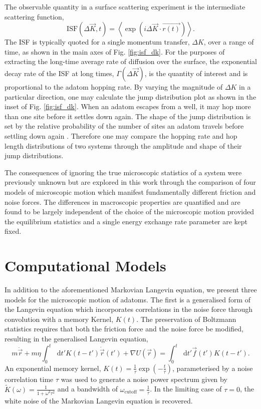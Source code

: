 \documentclass[7pt]{article}
\newcommand*{\diff}{\mathop{}\!\mathrm{d}}
\begin{document}
The observable quantity in a surface scattering experiment is the intermediate scattering function,
$$
\mathrm{ISF}(\Delta{\vec{K}}, t) = \left<\exp\left(i\Delta{\vec{K}}\cdot\vec{r(t)}\right)\right>.
$$
The ISF is typically quoted for a single momentum transfer, $\Delta{K}$, over a range of time, as shown in the main axes of Fig. \ref{fig:isf_dk}. For the purposes of extracting the long-time average rate of diffusion over the surface, the exponential decay rate of the ISF at long times, $\Gamma(\Delta{\vec{K}})$, is the quantity of interest and is proportional to the adatom hopping rate\cite{Chudley}. By varying the magnitude of $\Delta{K}$ in a particular direction, one may calculate the jump distribution plot as shown in the inset of Fig. \ref{fig:isf_dk}. When an adatom escapes from a well, it may hop more than one site before it settles down again. The shape of the jump distribution is set by the relative probability of the number of sites an adatom travels before settling down again \cite{Chudley}. Therefore one may compare the hopping rate and hop length distributions of two systems through the amplitude and shape of their jump distributions.

The consequences of ignoring the true microscopic statistics of a system were previously unknown but are explored in this work through the comparison of four models of microscopic motion which manifest fundamentally different friction and noise forces. The differences in macroscopic properties are quantified and are found to be largely independent of the choice of the microscopic motion provided the equilibrium statistics and a single energy exchange rate parameter are kept fixed. 

\section*{Computational Models}

In addition to the aforementioned Markovian Langevin equation, we present three models for the microscopic motion of adatoms. The first is a generalised form of the Langevin equation which incorporates correlations in the noise force through convolution with a memory Kernel, $K(t)$. The preservation of Boltzmann statistics requires that both the friction force and the noise force be modified, resulting in the generalised Langevin equation\cite{Kubo},
\begin{equation}
	m\ddot{\vec{r}}+m\eta\int_0^t\diff{t'}K(t-t')\dot{\vec{r}}(t')+\nabla U(\vec{r})=\int_0^t\diff{t'}\vec{f}(t')K(t-t').
	\label{eq:gle}
\end{equation}
An exponential memory kernel, $K(t)=\frac{1}{\tau}\exp\left(-\frac{t}{\tau}\right)$, parameterised by a noise correlation time $\tau$ was used to generate a noise power spectrum given by $\tilde{K}(\omega)=\frac{1}{1+\omega^2\tau^2}$ and a bandwidth of $\omega_\text{cutoff}=\frac{1}{\tau}$. In the limiting case of $\tau=0$, the white noise of the Markovian Langevin equation is recovered. 
\end{document}
